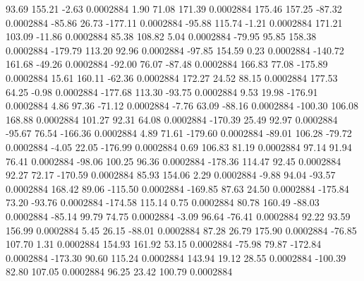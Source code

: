        93.69      155.21       -2.63     0.0002884
        1.90       71.08      171.39     0.0002884
      175.46      157.25      -87.32     0.0002884
      -85.86       26.73     -177.11     0.0002884
      -95.88      115.74       -1.21     0.0002884
      171.21      103.09      -11.86     0.0002884
       85.38      108.82        5.04     0.0002884
      -79.95       95.85      158.38     0.0002884
     -179.79      113.20       92.96     0.0002884
      -97.85      154.59        0.23     0.0002884
     -140.72      161.68      -49.26     0.0002884
      -92.00       76.07      -87.48     0.0002884
      166.83       77.08     -175.89     0.0002884
       15.61      160.11      -62.36     0.0002884
      172.27       24.52       88.15     0.0002884
      177.53       64.25       -0.98     0.0002884
     -177.68      113.30      -93.75     0.0002884
        9.53       19.98     -176.91     0.0002884
        4.86       97.36      -71.12     0.0002884
       -7.76       63.09      -88.16     0.0002884
     -100.30      106.08      168.88     0.0002884
      101.27       92.31       64.08     0.0002884
     -170.39       25.49       92.97     0.0002884
      -95.67       76.54     -166.36     0.0002884
        4.89       71.61     -179.60     0.0002884
      -89.01      106.28      -79.72     0.0002884
       -4.05       22.05     -176.99     0.0002884
        0.69      106.83       81.19     0.0002884
       97.14       91.94       76.41     0.0002884
      -98.06      100.25       96.36     0.0002884
     -178.36      114.47       92.45     0.0002884
       92.27       72.17     -170.59     0.0002884
       85.93      154.06        2.29     0.0002884
       -9.88       94.04      -93.57     0.0002884
      168.42       89.06     -115.50     0.0002884
     -169.85       87.63       24.50     0.0002884
     -175.84       73.20      -93.76     0.0002884
     -174.58      115.14        0.75     0.0002884
       80.78      160.49      -88.03     0.0002884
      -85.14       99.79       74.75     0.0002884
       -3.09       96.64      -76.41     0.0002884
       92.22       93.59      156.99     0.0002884
        5.45       26.15      -88.01     0.0002884
       87.28       26.79      175.90     0.0002884
      -76.85      107.70        1.31     0.0002884
      154.93      161.92       53.15     0.0002884
      -75.98       79.87     -172.84     0.0002884
     -173.30       90.60      115.24     0.0002884
      143.94       19.12       28.55     0.0002884
     -100.39       82.80      107.05     0.0002884
       96.25       23.42      100.79     0.0002884
